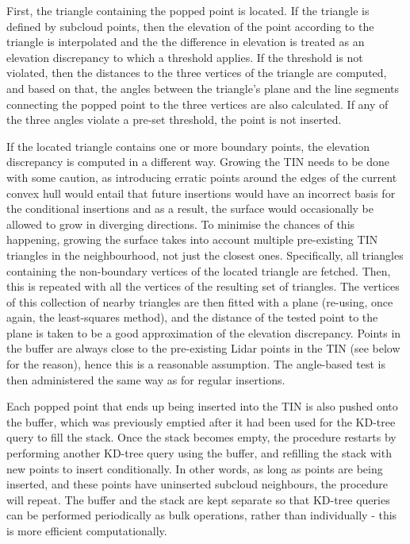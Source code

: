 First, the triangle containing the popped point is located. If the triangle is defined by subcloud points, then the elevation of the point according to the triangle is interpolated and the the difference in elevation is treated as an elevation discrepancy to which a threshold applies. If the threshold is not violated, then the distances to the three vertices of the triangle are computed, and based on that, the angles between the triangle's plane and the line segments connecting the popped point to the three vertices are also calculated. If any of the three angles violate a pre-set threshold, the point is not inserted.

If the located triangle contains one or more boundary points, the elevation discrepancy is computed in a different way. Growing the TIN needs to be done with some caution, as introducing erratic points around the edges of the current convex hull would entail that future insertions would have an incorrect basis for the conditional insertions and as a result, the surface would occasionally be allowed to grow in diverging directions. To minimise the chances of this happening, growing the surface takes into account multiple pre-existing TIN triangles in the neighbourhood, not just the closest ones. Specifically, all triangles containing the non-boundary vertices of the located triangle are fetched. Then, this is repeated with all the vertices of the resulting set of triangles. The vertices of this collection of nearby triangles are then fitted with a plane (re-using, once again, the least-squares method), and the distance of the tested point to the plane is taken to be a good approximation of the elevation discrepancy. Points in the buffer are always close to the pre-existing Lidar points in the TIN (see below for the reason), hence this is a reasonable assumption. The angle-based test is then administered the same way as for regular insertions.

Each popped point that ends up being inserted into the TIN is also pushed onto the buffer, which was previously emptied after it had been used for the KD-tree query to fill the stack. Once the stack becomes empty, the procedure restarts by performing another KD-tree query using the buffer, and refilling the stack with new points to insert conditionally. In other words, as long as points are being inserted, and these points have uninserted subcloud neighbours, the procedure will repeat. The buffer and the stack are kept separate so that KD-tree queries can be performed periodically as bulk operations, rather than individually - this is more efficient computationally.

